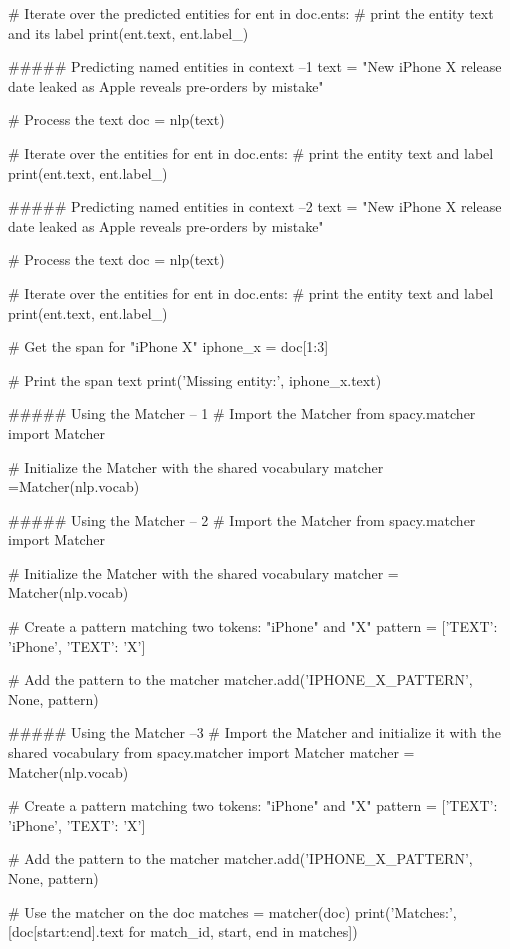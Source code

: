 # Iterate over the predicted entities
for ent in doc.ents:
    # print the entity text and its label
    print(ent.text, ent.label_)


##### Predicting named entities in context --1
text = "New iPhone X release date leaked as Apple reveals pre-orders by mistake"

# Process the text
doc = nlp(text)

# Iterate over the entities
for ent in doc.ents:
    # print the entity text and label
    print(ent.text, ent.label_)




##### Predicting named entities in context  --2
text = "New iPhone X release date leaked as Apple reveals pre-orders by mistake"

# Process the text
doc = nlp(text)

# Iterate over the entities
for ent in doc.ents:
    # print the entity text and label
    print(ent.text, ent.label_)

# Get the span for "iPhone X"
iphone_x = doc[1:3]

# Print the span text
print('Missing entity:', iphone_x.text)


##### Using the Matcher  -- 1
# Import the Matcher
from spacy.matcher import Matcher

# Initialize the Matcher with the shared vocabulary
matcher =Matcher(nlp.vocab)



##### Using the Matcher  -- 2
# Import the Matcher
from spacy.matcher import Matcher

# Initialize the Matcher with the shared vocabulary
matcher = Matcher(nlp.vocab)

# Create a pattern matching two tokens: "iPhone" and "X"
pattern = [{'TEXT': 'iPhone'}, {'TEXT': 'X'}]

# Add the pattern to the matcher
matcher.add('IPHONE_X_PATTERN', None, pattern)




##### Using the Matcher  --3
# Import the Matcher and initialize it with the shared vocabulary
from spacy.matcher import Matcher
matcher = Matcher(nlp.vocab)

# Create a pattern matching two tokens: "iPhone" and "X"
pattern = [{'TEXT': 'iPhone'}, {'TEXT': 'X'}]

# Add the pattern to the matcher
matcher.add('IPHONE_X_PATTERN', None, pattern)

# Use the matcher on the doc
matches = matcher(doc)
print('Matches:', [doc[start:end].text for match_id, start, end in matches])



